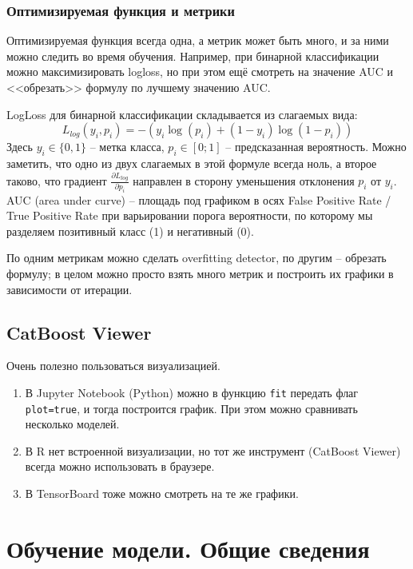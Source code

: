 \documentclass[a4paper,12pt]{article}
\begin{document}
\subsubsection{Оптимизируемая функция и метрики}

Оптимизируемая функция всегда одна, а метрик может быть много, и за ними можно следить во время обучения.
Например, при бинарной классификации можно максимизировать logloss, но при этом ещё смотреть на значение AUC и <<обрезать>> формулу по лучшему значению AUC.
\begin{leftbar}
	LogLoss для бинарной классификации складывается из слагаемых вида:
	$$ L_{log}(y_i, p_i) = -(y_i \log(p_i) + (1-y_i) \log(1-p_i)) $$
	Здесь $ y_i \in \{0, 1\} $ -- метка класса, $p_i \in [0;1]$ -- предсказанная вероятность.
	Можно заметить, что одно из двух слагаемых в этой формуле всегда ноль, а второе таково, что градиент $\frac{\partial L_{log}}{\partial p_i}$ направлен в сторону уменьшения отклонения $p_i$ от $y_i$. \\
	
	AUC (area under curve) -- площадь под графиком в осях False Positive Rate / True Positive Rate при варьировании порога вероятности, по которому мы разделяем позитивный класс (1) и негативный (0).
\end{leftbar}
По одним метрикам можно сделать overfitting detector, по другим -- обрезать формулу; в целом можно просто взять много метрик и построить их графики в зависимости от итерации.

\subsection{CatBoost Viewer}

Очень полезно пользоваться визуализацией.
\begin{enumerate}[noitemsep]
    \item В Jupyter Notebook (Python) можно в функцию \texttt{fit} передать флаг \texttt{plot=true}, и тогда построится график.
    При этом можно сравнивать несколько моделей.
    \item В R нет встроенной визуализации, но тот же инструмент (CatBoost Viewer) всегда можно использовать в браузере.
    \item В TensorBoard тоже можно смотреть на те же графики.
\end{enumerate}

\section{Обучение модели. Общие сведения}
\end{document}
